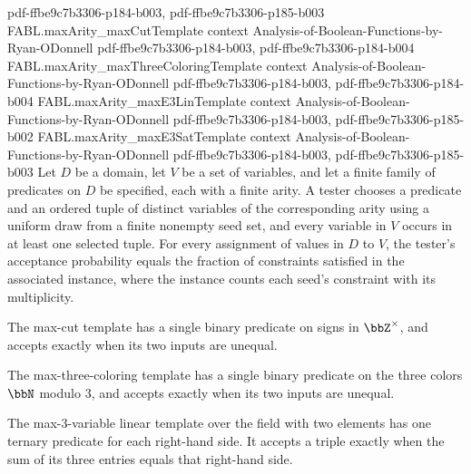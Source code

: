 \begin{theorem}
  {pdf-ffbe9c7b3306-p184-b003,
    pdf-ffbe9c7b3306-p185-b003}
\proofstep
  {FABL.maxArity_maxCutTemplate}
  {context}
  {Analysis-of-Boolean-Functions-by-Ryan-ODonnell}
  {pdf-ffbe9c7b3306-p184-b003,
    pdf-ffbe9c7b3306-p184-b004}
\proofstep
  {FABL.maxArity_maxThreeColoringTemplate}
  {context}
  {Analysis-of-Boolean-Functions-by-Ryan-ODonnell}
  {pdf-ffbe9c7b3306-p184-b003,
    pdf-ffbe9c7b3306-p184-b004}
\proofstep
  {FABL.maxArity_maxE3LinTemplate}
  {context}
  {Analysis-of-Boolean-Functions-by-Ryan-ODonnell}
  {pdf-ffbe9c7b3306-p184-b003,
    pdf-ffbe9c7b3306-p185-b002}
\proofstep
  {FABL.maxArity_maxE3SatTemplate}
  {context}
  {Analysis-of-Boolean-Functions-by-Ryan-ODonnell}
  {pdf-ffbe9c7b3306-p184-b003,
    pdf-ffbe9c7b3306-p185-b003}
Let $D$ be a domain, let $V$ be a set of variables, and let a finite family of
predicates on $D$ be specified, each with a finite arity. A tester chooses a predicate
and an ordered tuple of distinct variables of the corresponding arity using a uniform
draw from a finite nonempty seed set, and every variable in $V$ occurs in at least one
selected tuple. For every assignment of values in $D$ to $V$, the tester’s acceptance
probability equals the fraction of constraints satisfied in the associated instance,
where the instance counts each seed’s constraint with its multiplicity.
\end{theorem}

\begin{definition}
\label{FABL.maxCutTemplate}
\leanok
{}
The max-cut template has a single binary predicate on signs in $\bbZ^{\times}$, and
accepts exactly when its two inputs are unequal.
\end{definition}

\begin{definition}
\label{FABL.maxThreeColoringTemplate}
\leanok
{}
The max-three-coloring template has a single binary predicate on the three colors $\bbN$
modulo $3$, and accepts exactly when its two inputs are unequal.
\end{definition}

\begin{definition}
\label{FABL.maxE3LinTemplate}
\leanok
{}
The max-$3$-variable linear template over the field with two elements has one ternary
predicate for each right-hand side. It accepts a triple exactly when the sum of its
three entries equals that right-hand side.
\end{definition}

